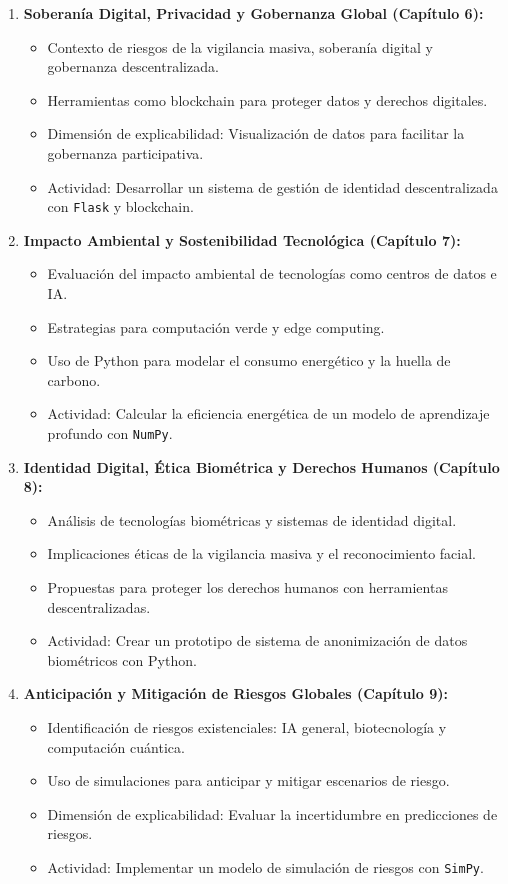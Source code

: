 \begin{refsection}
\begin{enumerate}
\item \textbf{Soberanía Digital, Privacidad y Gobernanza Global (Capítulo 6):}  
\begin{itemize}
    \item Contexto de riesgos de la vigilancia masiva, soberanía digital y gobernanza descentralizada.
    \item Herramientas como blockchain para proteger datos y derechos digitales.
    \item Dimensión de explicabilidad: Visualización de datos para facilitar la gobernanza participativa.
    \item Actividad: Desarrollar un sistema de gestión de identidad descentralizada con \texttt{Flask} y blockchain.
\end{itemize}

\item \textbf{Impacto Ambiental y Sostenibilidad Tecnológica (Capítulo 7):}  
\begin{itemize}
    \item Evaluación del impacto ambiental de tecnologías como centros de datos e IA.
    \item Estrategias para computación verde y edge computing.
    \item Uso de Python para modelar el consumo energético y la huella de carbono.
    \item Actividad: Calcular la eficiencia energética de un modelo de aprendizaje profundo con \texttt{NumPy}.
\end{itemize}

\item \textbf{Identidad Digital, Ética Biométrica y Derechos Humanos (Capítulo 8):}  
\begin{itemize}
    \item Análisis de tecnologías biométricas y sistemas de identidad digital.
    \item Implicaciones éticas de la vigilancia masiva y el reconocimiento facial.
    \item Propuestas para proteger los derechos humanos con herramientas descentralizadas.
    \item Actividad: Crear un prototipo de sistema de anonimización de datos biométricos con Python.
\end{itemize}

\item \textbf{Anticipación y Mitigación de Riesgos Globales (Capítulo 9):}  
\begin{itemize}
    \item Identificación de riesgos existenciales: IA general, biotecnología y computación cuántica.
    \item Uso de simulaciones para anticipar y mitigar escenarios de riesgo.
    \item Dimensión de explicabilidad: Evaluar la incertidumbre en predicciones de riesgos.
    \item Actividad: Implementar un modelo de simulación de riesgos con \texttt{SimPy}.
\end{itemize}


\end{enumerate}
\end{refsection}
